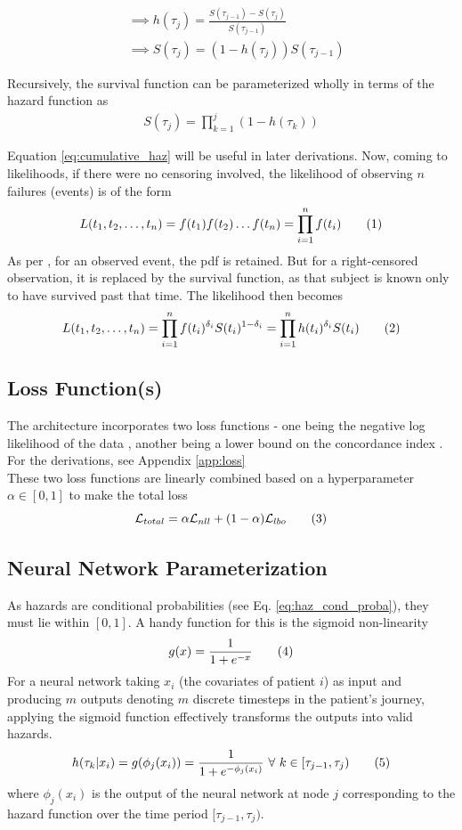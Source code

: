 \documentclass[%
 twocolumn,
 reprint,
 amsmath,amssymb,
 aps,nofootinbib
]{revtex4-2}
\newcommand\numberthis{\addtocounter{equation}{1}\tag{\theequation}} %
\begin{document}
\begin{align*}
&\implies  h(\tau_j) = \frac{S(\tau_{j-1}) - S(\tau_j)}{S(\tau_{j-1})}\\
&\implies S(\tau_j) = (1 - h(\tau_j))S(\tau_{j-1})
\end{align*}

Recursively, the survival function can be parameterized wholly in terms of the hazard function as
\begin{align}
S(\tau_j) = \prod_{k=1}^{j}(1 - h(\tau_k)) \label{eq:cumulative_haz}
\end{align}

Equation \ref{eq:cumulative_haz} will be useful in later derivations. Now, coming to likelihoods, if there were no censoring involved, the likelihood of observing $n$ failures (events) is of the form
\[
L(t_1 , t_2 , \ldots , t_n) = f(t_1)f(t_2)\ldots f(t_n)=\prod^{n}_{i=1}f(t_i) \numberthis  \label{eq:likelihood_no_censor}
\]
As per \cite{Moore_2016}, for an observed event, the pdf is retained. But for a right-censored observation, it is replaced by the survival function, as that subject is known only to have survived past that time. The likelihood then becomes
\[
L(t_1 , t_2 , \ldots , t_n) = \prod^{n}_{i=1}f(t_i)^{\delta_i}S(t_i)^{1-\delta_i}=\prod^{n}_{i=1}h(t_i)^{\delta_i}S(t_i) \numberthis  \label{eq:likelihood_censor}
\]

\subsection{\label{loss}Loss Function(s)}
The architecture incorporates two loss functions - one being the negative log likelihood of the data \cite{kvamme_continuous_2019}, another being a lower bound on the concordance index \cite{raykar_cindex}. For the derivations, see Appendix \ref{app:loss}\\

These two loss functions are linearly combined based on a hyperparameter $\alpha \in [0,1]$ to make the total loss
\[
\mathcal{L}_{total} = \alpha\mathcal{L}_{nll} + (1 - \alpha)\mathcal{L}_{lbo} \numberthis  \label{eq:l_total}
\]

\subsection{\label{nn_param}Neural Network Parameterization}
As hazards are conditional probabilities (see Eq. \ref{eq:haz_cond_proba}), they must lie within $[0,1]$. A handy function for this is the sigmoid non-linearity
\[
g(x) = \frac{1}{1+e^{-x}} \numberthis  \label{eq:sigmoid}
\]
For a neural network taking $x_i$ (the covariates of patient $i$) as input and producing $m$ outputs denoting $m$ discrete timesteps in the patient's journey, applying the sigmoid function effectively transforms the outputs into valid hazards.
\[
h(\tau_k|x_i) = g(\phi_j(x_i)) = \frac{1}{1+e^{-\phi_j(x_i)}}\ \forall \ k \in [\tau_{j-1}, \tau_j)
\numberthis  \label{eq:nn_param}
\]
where $\phi_j(x_i)$ is the output of the neural network at node $j$ corresponding to the hazard function over the time period $[\tau_{j-1}, \tau_j)$.\\
\end{document}
